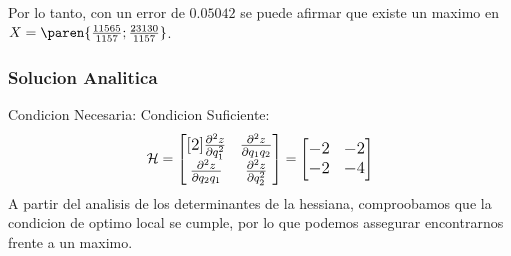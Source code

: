 \begin{homeworkProblem}
Por lo tanto, con un error de $0.05042$ se puede afirmar que existe un maximo en $X=\paren{\frac{11565}{1157};\frac{23130}{1157}}$.


\subsubsection{Solucion Analitica}
Condicion Necesaria:
Condicion Suficiente:\\
\begin{align*}
    \mathcal{H}=\large{\begin{bmatrix}[2]
        \frac{\partial^2 z}{\partial q_1^2}  & \frac{\partial^2 z}{\partial q_1q_2} \\
         \frac{\partial^2 z}{\partial q_2q_1} & \frac{\partial^2 z}{\partial q_2^2}
    \end{bmatrix}} = \begin{bmatrix}
        -2 & -2 \\ -2 & -4
    \end{bmatrix}
\end{align*}
A partir del analisis de los determinantes de la hessiana, comproobamos que la condicion de optimo local se cumple, por lo que podemos assegurar encontrarnos frente a un maximo.
\end{homeworkProblem}